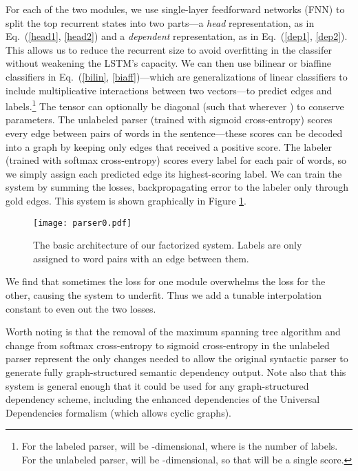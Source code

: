 \documentclass[11pt,a4paper]{article}
\begin{document}
For each of the two modules, we use single-layer feedforward networks (FNN) to split the top recurrent states into two parts---a \emph{head} representation, as in Eq.\ (\ref{head1}, \ref{head2}) and a \emph{dependent} representation, as in Eq.\ (\ref{dep1}, \ref{dep2}). This allows us to reduce the recurrent size to avoid overfitting in the classifer without weakening the LSTM's capacity. We can then use bilinear or biaffine classifiers in Eq.\ (\ref{bilin}, \ref{biaff})---which are generalizations of linear classifiers to include multiplicative interactions between two vectors---to predict edges and labels.\footnote{For the labeled parser,  will be -dimensional, where  is the number of labels. For the unlabeled parser,  will be -dimensional, so that  will be a single score.}
\newcommand{\eqscaler}[1]{\scalebox{.93}{ \ensuremath{#1}}}
\setlength{\belowdisplayskip}{2pt}\setlength{\belowdisplayshortskip}{2pt}
\setlength{\abovedisplayskip}{2pt}\setlength{\abovedisplayshortskip}{2pt}
\setlength{\belowdisplayskip}{7pt plus2pt minus5pt}\setlength{\belowdisplayshortskip}{4pt plus3pt minus3pt}
\setlength{\abovedisplayskip}{7pt plus2pt minus5pt}\setlength{\abovedisplayshortskip}{0pt plus3pt}The tensor  can optionally be diagonal (such that  wherever ) to conserve parameters. The unlabeled parser (trained with sigmoid cross-entropy) scores every edge between pairs of words in the sentence---these scores can be decoded into a graph by keeping only edges that received a positive score. The labeler (trained with softmax cross-entropy) scores every label for each pair of words, so we simply assign each predicted edge its highest-scoring label. We can train the system by summing the losses, backpropagating error to the labeler only through gold edges. This system is shown graphically in Figure \ref{DM17}.
\begin{figure}
  \centering \texttt{[image: parser0.pdf]}
  \caption{\label{DM17}The basic architecture of our factorized system. Labels are only assigned to word pairs with an edge between them.}
\end{figure}
We find that sometimes the loss for one module overwhelms the loss for the other, causing the system to underfit. Thus we add a tunable interpolation constant  to even out the two losses.


Worth noting is that the removal of the maximum spanning tree algorithm and change from softmax cross-entropy to sigmoid cross-entropy in the unlabeled parser represent the only changes needed to allow the original syntactic parser to generate fully graph-structured semantic dependency output. Note also that this system is general enough that it could be used for any graph-structured dependency scheme, including the enhanced dependencies of the Universal Dependencies formalism (which allows cyclic graphs).
\end{document}
